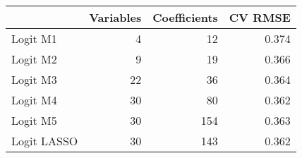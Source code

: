 

\begin{tabular}{lrrr}
\toprule
  & Variables & Coefficients & CV RMSE\\
\midrule
Logit M1 & 4        &12   & 0.374\\
Logit M2 & 9        &19   & 0.366\\
Logit M3 & 22       &36   & 0.364\\
Logit M4 & 30       &80   & 0.362\\
Logit M5 & 30       &154   & 0.363 \\
Logit LASSO & 30    &143   & 0.362 \\
\bottomrule
\end{tabular}



